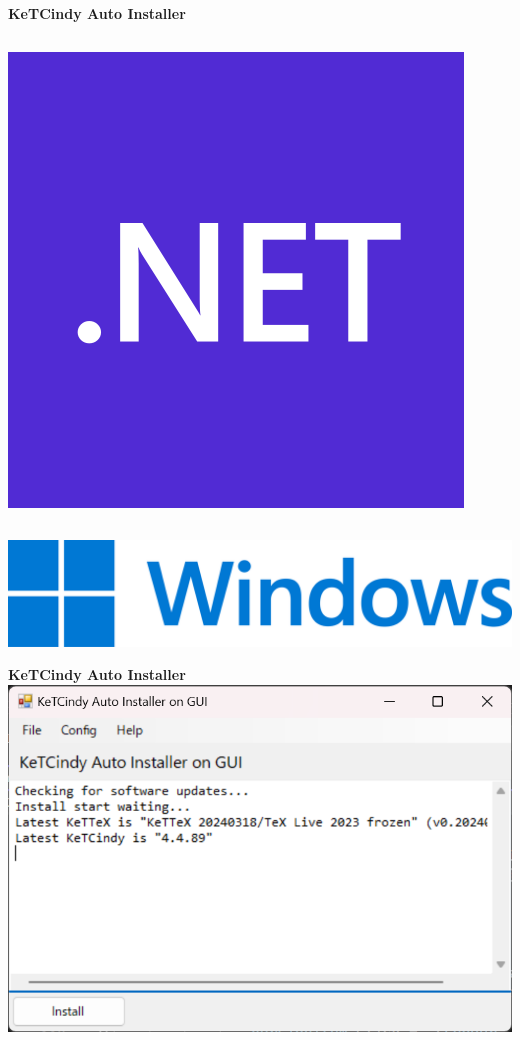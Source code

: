 \documentclass[dvipdfmx, unicode]{beamer}
\begin{document}
\begin{frame}[t]{\bfseries KeTCindy Auto Installer}
\begin{columns}[T]
\begin{column}{0.4\linewidth}
      \includegraphics[width=1.0\linewidth]{img/AutoInstaller/Microsoft_.NET_logo.png}
    \end{column}

  \end{columns}
  \includegraphics[width=1.0\linewidth]{img/AutoInstaller/Windows_logo.png}
\end{frame}

\begin{frame}{\bfseries KeTCindy Auto Installer}
  \includegraphics[width=1.0\linewidth]{img/AutoInstaller/installer_2.png}
\end{frame}
\end{document}
